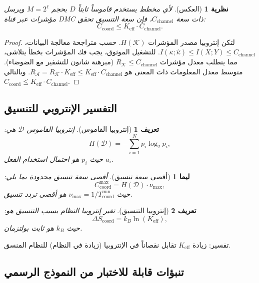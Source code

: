 \documentclass[11pt,a4paper]{article}
\newtheorem{definition}{تعريف}
\newtheorem{theorem}{نظرية}
\newtheorem{lemma}{ليما}
\begin{document}
	\begin{theorem}[العكس]
		لأي مخطط يستخدم قاموساً ثابتاً \(D\) بحجم \(M = 2^\ell\) ويرسل مؤشرات عبر قناة DMC ذات سعة \(C_{\mathrm{channel}}\)، فإن سعة التنسيق تحقق:
		\[
		C_{\mathrm{coord}} \le K_{\mathrm{eff}} \cdot C_{\mathrm{channel}}.
		\]
	\end{theorem}
	
	\begin{proof}
		لتكن إنتروبيا مصدر المؤشرات \(H(\mathcal{K})\). حسب متراجحة معالجة البيانات، \(I(\kappa;\hat{\kappa}) \le I(X;Y) \le C_{\mathrm{channel}}\). للتشغيل الموثوق، يجب فك المؤشرات بخطأ يتلاشى، مما يتطلب معدل مؤشرات \(R_{\mathcal{K}} \le C_{\mathrm{channel}}\) (مبرهنة شانون للتشفير مع الضوضاء). متوسط معدل المعلومات ذات المعنى هو \(R_{\mathcal{A}} = R_{\mathcal{K}} \cdot K_{\mathrm{eff}} \le K_{\mathrm{eff}} \cdot C_{\mathrm{channel}}\). وبالتالي \(C_{\mathrm{coord}} \le K_{\mathrm{eff}} \cdot C_{\mathrm{channel}}\).
	\end{proof}
	
	\subsection{التفسير الإنتروبي للتنسيق}
	\label{app:entropy}
	
	\begin{definition}[إنتروبيا القاموس]
		إنتروبيا القاموس $\mathcal{D}$ هي:
		\[
		H(\mathcal{D}) = - \sum_{i=1}^{N} p_i \log_2 p_i,
		\]
		حيث $p_i$ هو احتمال استخدام الفعل $a_i$.
	\end{definition}
	
	\begin{lemma}[أقصى سعة تنسيق]
		أقصى سعة تنسيق محدودة بما يلي:
		\[
		C_{\text{coord}}^{\text{max}} = H(\mathcal{D}) \cdot \nu_{\text{max}},
		\]
		حيث $\nu_{\text{max}} = 1 / T_{\text{coord}}^{\text{min}}$ هو أقصى تردد تنسيق.
	\end{lemma}
	
	\begin{definition}[إنتروبيا التنسيق]
		تغير إنتروبيا النظام بسبب التنسيق هو:
		\[
		\Delta S_{\text{coord}} = k_B \ln(K_{\mathrm{eff}}),
		\]
		حيث $k_B$ هو ثابت بولتزمان.
	\end{definition}
	
	تفسير: زيادة $K_{\mathrm{eff}}$ تقابل نقصاناً في الإنتروبيا (زيادة في النظام) للنظام المنسق.
	
	\subsection{تنبؤات قابلة للاختبار من النموذج الرسمي}
	\label{app:predictions}
	
\end{document}
